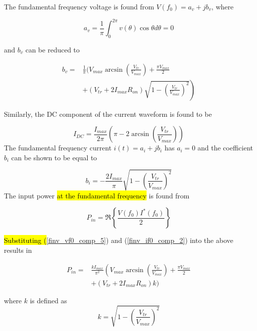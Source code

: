 The fundamental frequency voltage is found from $V(f_0)=a_v+jb_v$, where
\begin{shaded}
\begin{equation}
a_v=\frac{1}{\pi}\int_0^{2\pi}v(\theta)\cos \theta d\theta = 0
\end{equation}
\end{shaded}
and $b_v$ can be reduced to


\begin{equation}\label{finv_vf0_comp_5}\begin{split}
    b_v =& \frac{1}{\pi}\Bigg(V_{max}\arcsin\left(\frac{V_{tr}}{V_{max}}\right)+ \frac{\pi V_{max}}{2}  \\
    &+ \left.\left(V_{tr} + 2I_{max}R_{on}\right) \sqrt{1 - \left(\frac{V_{tr}}{V_{max}}\right)^2}\right)
\end{split}\end{equation}

Similarly, the DC component of the current waveform is found to be

\begin{equation}\label{finv_idc_comp_3}
    I_{DC} = \frac{I_{max}}{2\pi}\left(\pi - 2\arcsin\left(\frac{V_{tr}}{V_{max}}\right)\right)
\end{equation}
The fundamental frequency current $i(t)=a_i+jb_i$ has $a_i=0$ and the coefficient $b_i$ can be shown to be equal to

\begin{equation}\label{finv_if0_comp_2}
    b_i = -\frac{2I_{max}}{\pi}\sqrt{1 - \left(\frac{V_{tr}}{V_{max}}\right)^2}
\end{equation}
The input power \hl{at the fundamental frequency} is found from 


\begin{equation}\label{Pin}
  P_{in} = \Re\left\{\frac{V(f_0)I^{*}(f_0)}{2}\right\}
\end{equation}


\hl{Substituting (}\ref{finv_vf0_comp_5}) and (\ref{finv_if0_comp_2}) into the above results in

\begin{shaded}
\begin{equation}\begin{split}\label{Pin_diode2}
    P_{in} =& \frac{kI_{max}}{\pi^2}\left(V_{max}\arcsin\left(\frac{V_{tr}}{V_{max}}\right) + \frac{\pi V_{max}}{2} \right. \\
   &+ \left(V_{tr}+2I_{max}R_{on}\right)k\bigg)
\end{split}\end{equation}
\end{shaded}
where $k$ is defined as
\begin{equation}\label{k}
    k = \sqrt{1 - \left(\frac{V_{tr}}{V_{max}}\right)^2}
\end{equation}

